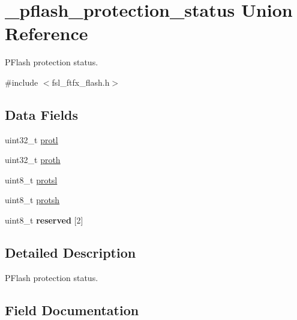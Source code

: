 \hypertarget{union__pflash__protection__status}{}\section{\+\_\+pflash\+\_\+protection\+\_\+status Union Reference}
\label{union__pflash__protection__status}


P\+Flash protection status.  




{\ttfamily \#include $<$fsl\+\_\+ftfx\+\_\+flash.\+h$>$}

\subsection*{Data Fields}
\begin{DoxyCompactItemize}
\item 
uint32\+\_\+t \mbox{\hyperlink{union__pflash__protection__status_a7ac6513cf1f47a97b917bcc2525c2ba7}{protl}}
\item 
uint32\+\_\+t \mbox{\hyperlink{union__pflash__protection__status_aacd0fd9665c5fd6e07006f6641fb5781}{proth}}
\item 
uint8\+\_\+t \mbox{\hyperlink{union__pflash__protection__status_af69c0b944c0dfea11dca8835c0305ad6}{protsl}}
\item 
uint8\+\_\+t \mbox{\hyperlink{union__pflash__protection__status_add016e0d6e03ac671de618f4c4a92c42}{protsh}}
\item 
\mbox{\label{union__pflash__protection__status_a8d7e0415efaf6e08cb6510401f765c28}} 
uint8\+\_\+t {\bfseries reserved} \mbox{[}2\mbox{]}
\end{DoxyCompactItemize}


\subsection{Detailed Description}
P\+Flash protection status. 

\subsection{Field Documentation}
\mbox{\label{union__pflash__protection__status_aacd0fd9665c5fd6e07006f6641fb5781}} 
